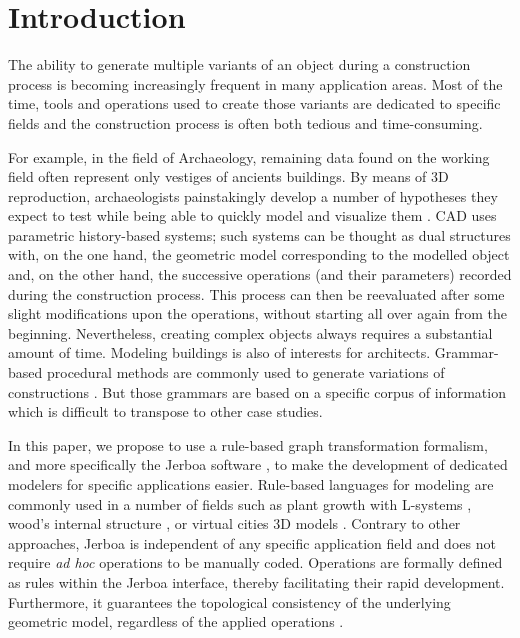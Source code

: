 \section{Introduction}

The ability to generate multiple variants of an object during a construction process is  becoming increasingly frequent in many application areas. Most of the time, tools and operations used to create those variants are dedicated to specific fields and the construction process is often both tedious and time-consuming.

For example, in the field of Archaeology, remaining data found on the working field often represent only vestiges of ancients buildings. By means of 3D
reproduction, archaeologists painstakingly develop a number of hypotheses
they expect to test while being able to quickly model and
visualize them \cite{Quattrini_Baleani_2015}. CAD uses parametric history-based systems; such systems can be thought as dual structures with,  on the one hand, the geometric model corresponding to the modelled
object and,  on the other hand, the successive operations (and their parameters) recorded during the construction process. This process can then be reevaluated after some slight modifications upon the operations, without starting all over again from the beginning. Nevertheless, creating complex objects always requires a substantial amount of time.
Modeling buildings is also of interests for architects. Grammar-based procedural methods are commonly used
to generate variations of constructions \cite{haegler2009procedural, muller2006procedural}. But those grammars are based on a specific corpus of information which is difficult to transpose to other case studies.

In this paper, we propose to use  a rule-based graph transformation formalism, and more specifically the Jerboa software \cite{belhaouari2014jerboa}, to make the development of dedicated modelers for
specific applications easier. Rule-based languages for modeling
are commonly used in a number of fields such as plant growth with L-systems \cite{lindenmayer1974adding, bohl2015modeling}, wood’s internal structure \cite{terraz20093gmap}, or virtual cities 3D models
\cite{esri2023cityengine, beirao2010implementing}. Contrary to other approaches, Jerboa is independent of any specific
application field and does not require \textit{ad hoc} operations to
be manually coded. Operations are formally defined as rules within the Jerboa interface, thereby facilitating their rapid development. Furthermore, it guarantees the topological %
consistency of the underlying geometric model,
regardless of the applied operations \cite{arnould2022preserving}.

